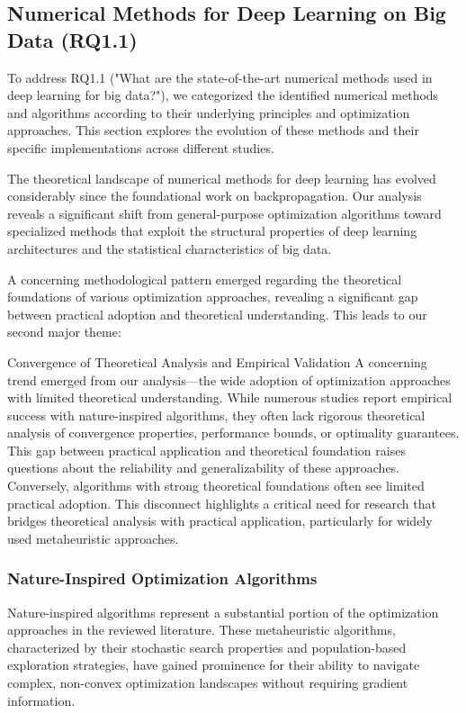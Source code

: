 \subsection{Numerical Methods for Deep Learning on Big Data (RQ1.1)}
To address RQ1.1 ("What are the state-of-the-art numerical methods used in deep learning for big data?"), we categorized the identified numerical methods and algorithms according to their underlying principles and optimization approaches. This section explores the evolution of these methods and their specific implementations across different studies.

The theoretical landscape of numerical methods for deep learning has evolved considerably since the foundational work on backpropagation. Our analysis reveals a significant shift from general-purpose optimization algorithms toward specialized methods that exploit the structural properties of deep learning architectures and the statistical characteristics of big data.

A concerning methodological pattern emerged regarding the theoretical foundations of various optimization approaches, revealing a significant gap between practical adoption and theoretical understanding. This leads to our second major theme:

\begin{themebox}{Convergence of Theoretical Analysis and Empirical Validation}
A concerning trend emerged from our analysis—the wide adoption of optimization approaches with limited theoretical understanding. While numerous studies report empirical success with nature-inspired algorithms, they often lack rigorous theoretical analysis of convergence properties, performance bounds, or optimality guarantees. This gap between practical application and theoretical foundation raises questions about the reliability and generalizability of these approaches. Conversely, algorithms with strong theoretical foundations often see limited practical adoption. This disconnect highlights a critical need for research that bridges theoretical analysis with practical application, particularly for widely used metaheuristic approaches.
\end{themebox}

\subsubsection{Nature-Inspired Optimization Algorithms}
Nature-inspired algorithms represent a substantial portion of the optimization approaches in the reviewed literature. These metaheuristic algorithms, characterized by their stochastic search properties and population-based exploration strategies, have gained prominence for their ability to navigate complex, non-convex optimization landscapes without requiring gradient information.

